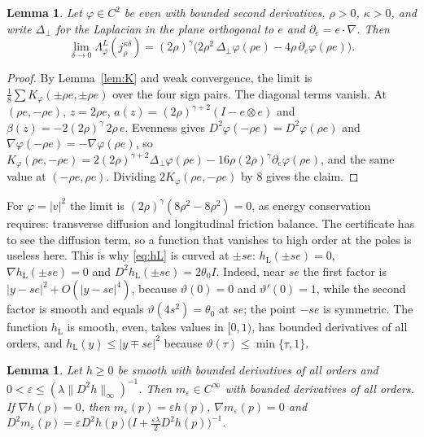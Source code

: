 \documentclass[11pt]{amsart}
\newtheorem{lemma}[theorem]{Lemma}
\theoremstyle{definition}
\newcommand{\hL}{h_{\mathrm L}}
\begin{document}
\begin{lemma}\label{lem:diracL}
Let $\varphi\in C^2$ be even with bounded second derivatives, $\rho>0$, $\kappa>0$, and write $\Delta_\perp$ for the Laplacian in the plane orthogonal to $e$ and $\partial_e=e\cdot\nabla$. Then
\[
\lim_{\delta\to0}\Lambda^L_\varphi(j^{\kappa\delta}_\rho)=(2\rho)^\gamma\big(2\rho^2\,\Delta_\perp\varphi(\rho e)-4\rho\,\partial_e\varphi(\rho e)\big).
\]
\end{lemma}

\begin{proof}
By Lemma~\ref{lem:K} and weak convergence, the limit is $\frac18\sum K_\varphi(\pm\rho e,\pm\rho e)$ over the four sign pairs. The diagonal terms vanish. At $(\rho e,-\rho e)$, $z=2\rho e$, $a(z)=(2\rho)^{\gamma+2}(I-e\otimes e)$ and $\beta(z)=-2(2\rho)^{\gamma}\,2\rho\,e$. Evenness gives $D^2\varphi(-\rho e)=D^2\varphi(\rho e)$ and $\nabla\varphi(-\rho e)=-\nabla\varphi(\rho e)$, so $K_\varphi(\rho e,-\rho e)=2(2\rho)^{\gamma+2}\Delta_\perp\varphi(\rho e)-16\rho(2\rho)^\gamma\partial_e\varphi(\rho e)$, and the same value at $(-\rho e,\rho e)$. Dividing $2K_\varphi(\rho e,-\rho e)$ by $8$ gives the claim.
\end{proof}

For $\varphi=|v|^2$ the limit is $(2\rho)^\gamma(8\rho^2-8\rho^2)=0$, as energy conservation requires: transverse diffusion and longitudinal friction balance. The certificate has to see the diffusion term, so a function that vanishes to high order at the poles is useless here. This is why \eqref{eq:hL} is curved at $\pm se$: $\hL(\pm se)=0$, $\nabla\hL(\pm se)=0$ and $D^2\hL(\pm se)=2\theta_0 I$. Indeed, near $se$ the first factor is $|y-se|^2+O(|y-se|^4)$, because $\vartheta(0)=0$ and $\vartheta'(0)=1$, while the second factor is smooth and equals $\vartheta(4s^2)=\theta_0$ at $se$; the point $-se$ is symmetric. The function $\hL$ is smooth, even, takes values in $[0,1)$, has bounded derivatives of all orders, and $\hL(y)\le|y\mp se|^2$ because $\vartheta(\tau)\le\min\{\tau,1\}$.

\begin{lemma}\label{lem:smooth}
Let $h\ge0$ be smooth with bounded derivatives of all orders and $0<\varepsilon\le(\lambda\|D^2h\|_\infty)^{-1}$. Then $m_\varepsilon\in C^\infty$ with bounded derivatives of all orders. If $\nabla h(p)=0$, then $m_\varepsilon(p)=\varepsilon h(p)$, $\nabla m_\varepsilon(p)=0$ and $D^2m_\varepsilon(p)=\varepsilon D^2h(p)\big(I+\tfrac{\varepsilon\lambda}2D^2h(p)\big)^{-1}$.
\end{lemma}
\end{document}
